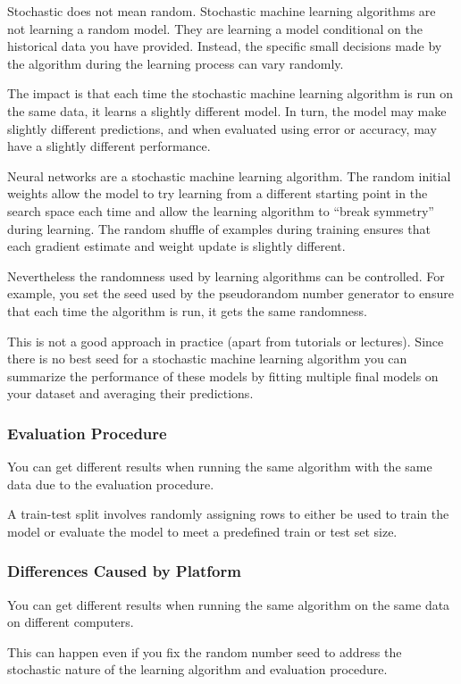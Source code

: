 Stochastic does not mean random. Stochastic machine learning algorithms are not learning a random model. They are learning a model conditional on the historical data you have provided. Instead, the specific small decisions made by the algorithm during the learning process can vary randomly.

The impact is that each time the stochastic machine learning algorithm is run on the same data, it learns a slightly different model. In turn, the model may make slightly different predictions, and when evaluated using error or accuracy, may have a slightly different performance.

Neural networks are a stochastic machine learning algorithm. The random initial weights allow the model to try learning from a different starting point in the search space each time and allow the learning algorithm to “break symmetry” during learning. The random shuffle of examples during training ensures that each gradient estimate and weight update is slightly different.

Nevertheless the randomness used by learning algorithms can be controlled. For example, you set the seed used by the pseudorandom number generator to ensure that each time the algorithm is run, it gets the same randomness.

This is not a good approach in practice (apart from tutorials or lectures). Since there is no best seed for a stochastic machine learning algorithm you can summarize the performance of these models by fitting multiple final models on your dataset and averaging their predictions.

\subsubsection{Evaluation Procedure}
You can get different results when running the same algorithm with the same data due to the evaluation procedure.

A train-test split involves randomly assigning rows to either be used to train the model or evaluate the model to meet a predefined train or test set size.

\subsubsection{Differences Caused by Platform}
You can get different results when running the same algorithm on the same data on different computers.

This can happen even if you fix the random number seed to address the stochastic nature of the learning algorithm and evaluation procedure.

